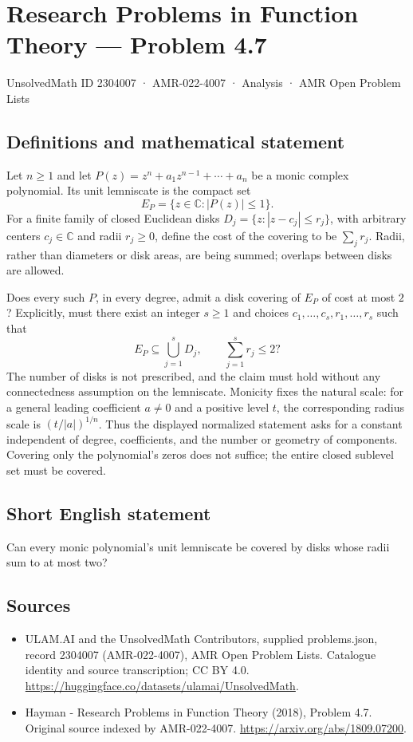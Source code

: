 \documentclass[11pt,a4paper]{article}
\begin{document}
\section*{Research Problems in Function Theory — Problem 4.7}\label{2304007}
{\small UnsolvedMath ID 2304007 · AMR-022-4007 · Analysis · AMR Open Problem Lists}
\subsection{Definitions and mathematical statement}
Let $n\geq1$ and let
$P(z)=z^n+a_1z^{n-1}+\cdots+a_n$ be a monic complex polynomial.
Its unit lemniscate is the compact set
\[
 E_P=\{z\in\mathbb C:|P(z)|\leq1\}.
\]
For a finite family of closed Euclidean disks
$D_j=\{z:|z-c_j|\leq r_j\}$, with arbitrary centers $c_j\in\mathbb C$
and radii $r_j\geq0$, define the cost of the covering to be
$\sum_j r_j$. Radii, rather than diameters or disk areas, are being
summed; overlaps between disks are allowed.

Does every such $P$, in every degree, admit a disk covering of
$E_P$ of cost at most $2$? Explicitly, must there exist an integer
$s\geq1$ and choices $c_1,\ldots,c_s,r_1,\ldots,r_s$ such that
\[
 E_P\subseteq\bigcup_{j=1}^{s}D_j,
 \qquad \sum_{j=1}^{s}r_j\leq2?
\]
The number of disks is not prescribed, and the claim must hold
without any connectedness assumption on the lemniscate.
Monicity fixes the natural scale: for a general leading coefficient
$a\ne0$ and a positive level $t$, the corresponding radius scale is
$(t/|a|)^{1/n}$. Thus the displayed normalized statement asks for a
constant independent of degree, coefficients, and the number or
geometry of components. Covering only the polynomial's zeros does
not suffice; the entire closed sublevel set must be covered.
\subsection{Short English statement}
Can every monic polynomial's unit lemniscate be covered by disks whose radii sum to at most two?
\subsection{Sources}
\begin{itemize}
\item[S1] ULAM.AI and the UnsolvedMath Contributors, supplied problems.json, record 2304007 (AMR-022-4007), AMR Open Problem Lists. Catalogue identity and source transcription; CC BY 4.0.
\url{https://huggingface.co/datasets/ulamai/UnsolvedMath}.
\item[S2] Hayman - Research Problems in Function Theory (2018), Problem 4.7. Original source indexed by AMR-022-4007.
\url{https://arxiv.org/abs/1809.07200}.
\end{itemize}
\end{document}
